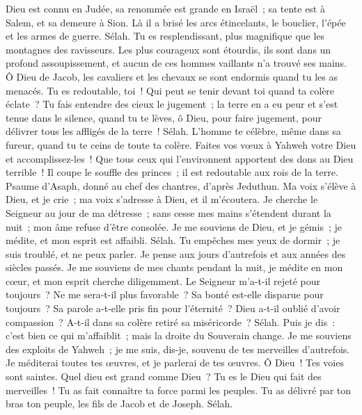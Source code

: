 \begin{multicols}{2}
Dieu est connu en Judée, sa renommée est grande en Israël~;
sa tente est à Salem, et sa demeure à Sion.
Là il a brisé les arcs étincelants, le bouclier, l'épée et les armes de guerre. Sélah.
Tu es resplendissant, plus magnifique que les montagnes des ravisseurs.
Les plus courageux sont étourdis, ils sont dans un profond assoupissement, et aucun de ces hommes vaillants n'a trouvé ses mains.
Ô Dieu de Jacob, les cavaliers et les chevaux se sont endormis quand tu les as menacés.
Tu es redoutable, toi~! Qui peut se tenir devant toi quand ta colère éclate~?
Tu fais entendre des cieux le jugement~; la terre en a eu peur et s'est tenue dans le silence,
quand tu te lèves, ô Dieu, pour faire jugement, pour délivrer tous les affligés de la terre~! Sélah.
L'homme te célèbre, même dans sa fureur, quand tu te ceins de toute ta colère.
Faites vos vœux à Yahweh votre Dieu et accomplissez-les~! Que tous ceux qui l'environnent apportent des dons au Dieu terrible~!
Il coupe le souffle des princes~; il est redoutable aux rois de la terre.
\VerseOne{}Psaume d'Asaph, donné au chef des chantres, d'après Jeduthun.
Ma voix s'élève à Dieu, et je crie~; ma voix s'adresse à Dieu, et il m'écoutera.
Je cherche le Seigneur au jour de ma détresse~; sans cesse mes mains s'étendent durant la nuit~; mon âme refuse d'être consolée.
Je me souviens de Dieu, et je gémis~; je médite, et mon esprit est affaibli. Sélah.
Tu empêches mes yeux de dormir~; je suis troublé, et ne peux parler.
Je pense aux jours d'autrefois et aux années des siècles passés.
Je me souviens de mes chants pendant la nuit, je médite en mon cœur, et mon esprit cherche diligemment.
Le Seigneur m'a-t-il rejeté pour toujours~? Ne me sera-t-il plus favorable~?
Sa bonté est-elle disparue pour toujours~? Sa parole a-t-elle pris fin pour l'éternité~?
Dieu a-t-il oublié d'avoir compassion~? A-t-il dans sa colère retiré sa miséricorde~? Sélah.
Puis je dis~: c'est bien ce qui m'affaiblit~; mais la droite du Souverain change.
Je me souviens des exploits de Yahweh~; je me suis, dis-je, souvenu de tes merveilles d'autrefois.
Je méditerai toutes tes œuvres, et je parlerai de tes œuvres.
Ô Dieu~! Tes voies sont saintes. Quel dieu est grand comme Dieu~?
Tu es le Dieu qui fait des merveilles~! Tu as fait connaître ta force parmi les peuples.
Tu as délivré par ton bras ton peuple, les fils de Jacob et de Joseph. Sélah.

\end{multicols}
